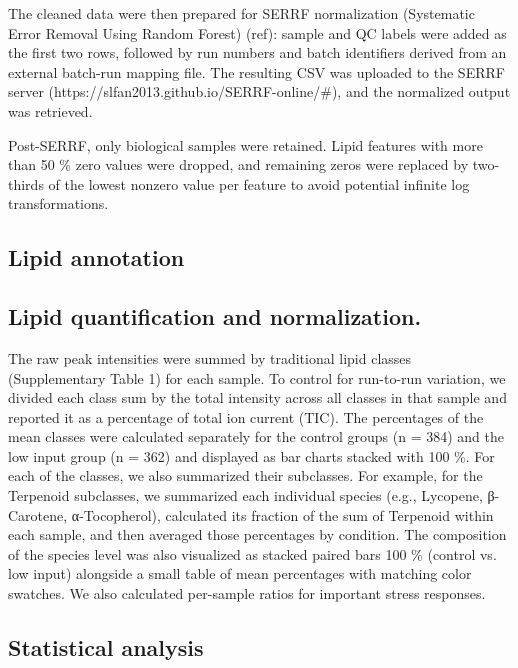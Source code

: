 \documentclass[10pt,letterpaper]{article}
\begin{document}
The cleaned data were then prepared for SERRF normalization (Systematic Error Removal Using Random Forest) (ref): sample and QC labels were added as the first two rows, followed by run numbers and batch identifiers derived from an external batch-run mapping file. The resulting CSV was uploaded to the SERRF server (https://slfan2013.github.io/SERRF-online/#), and the normalized output was retrieved.

Post-SERRF, only biological samples were retained. Lipid features with more than 50 \% zero values were dropped, and remaining zeros were replaced by two-thirds of the lowest nonzero value per feature to avoid potential infinite log transformations.


\subsection*{Lipid annotation}

\subsection*{Lipid quantification and normalization.}

The raw peak intensities were summed by traditional lipid classes (Supplementary Table 1) for each sample. To control for run-to-run variation, we divided each class sum by the total intensity across all classes in that sample and reported it as a percentage of total ion current (TIC). The percentages of the mean classes were calculated separately for the control groups (n = 384) and the low input group (n = 362) and displayed as bar charts stacked with 100 \%. For each of the classes, we also summarized their subclasses. For example, for the Terpenoid subclasses, we summarized each individual species (e.g., Lycopene, β-Carotene, α-Tocopherol), calculated its fraction of the sum of Terpenoid within each sample, and then averaged those percentages by condition. The composition of the species level was also visualized as stacked paired bars 100 \% (control vs. low input) alongside a small table of mean percentages with matching color swatches. We also calculated per-sample ratios for important stress responses.

\subsection*{Statistical analysis}
\end{document}
